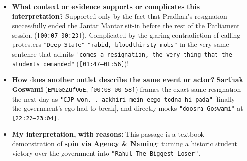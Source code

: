 \documentclass[10pt,a4paper]{article}
\begin{document}
\begin{itemize}[leftmargin=1.5em, itemsep=3pt, topsep=4pt]
  \item \textbf{What context or evidence supports or complicates this interpretation?} Supported only by the fact that Pradhan's resignation successfully ended the Jantar Mantar sit-in before the rest of the Parliament session (\texttt{[00:07--00:23]}). Complicated by the glaring contradiction of calling protesters \texttt{"Deep State"} \texttt{"rabid, bloodthirsty mobs"} in the very same sentence that admits \texttt{"comes a resignation, the very thing that the students demanded"} (\texttt{[01:47--01:56]})!
  \item \textbf{How does another outlet describe the same event or actor?} \textbf{Sarthak Goswami} (\texttt{EM1GeZufO6E}, \texttt{[00:08--00:58]}) frames the exact same resignation the next day as \texttt{"CJP won... aakhiri mein eego todna hi pada"} [finally the government's ego had to break], and directly mocks \texttt{"doosra Goswami"} at \texttt{[22:22--23:04]}.
  \item \textbf{My interpretation, with reasons:} This passage is a textbook demonstration of \textbf{spin via Agency \& Naming}: turning a historic student victory over the government into \texttt{"Rahul The Biggest Loser"}.
\end{itemize}
\end{document}
